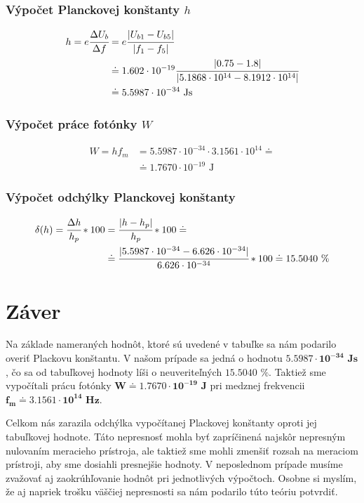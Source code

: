 \documentclass[12pt,a4paper,final]{report}
\begin{document}
\subsubsection{Výpočet Planckovej konštanty $h$}
\begin{align}
	h=e\cfrac{\Delta U_b}{\Delta f} &=e\cfrac{|U_{b1}-U_{b5}|}{|f_1-f_5|} \nonumber\\
	&\doteq 1.602\cdot 10^{-19} \cfrac{|0.75-1.8|}{|5.1868\cdot 10^{14}-8.1912\cdot 10^{14}|} \\
	&\doteq 5.5987\cdot10^{-34}\text{ Js}\nonumber
\end{align}

\subsubsection{Výpočet práce fotónky $W$}
\begin{align}
	W=hf_m &= 5.5987\cdot10^{-34} \cdot 3.1561\cdot10^{14}\doteq \\
	&\doteq 1.7670\cdot10^{-19}\text{ J}\nonumber
\end{align}

\subsubsection{Výpočet odchýlky Planckovej konštanty}
\begin{align}
	\delta(h)=\cfrac{\Delta h}{h_p}*100&=\cfrac{|h-h_p|}{h_p}*100\doteq\\
	&\doteq \cfrac{|5.5987\cdot10^{-34}-6.626\cdot10^{-34}|}{6.626\cdot10^{-34}}*100 \doteq 15.5040\text{ \%}\nonumber
\end{align}

\section*{Záver}
Na základe nameraných hodnôt, ktoré sú uvedené v tabuľke sa nám podarilo overiť Plackovu konštantu. V našom prípade sa jedná o hodnotu $\mathbf{5.5987\cdot10^{-34}\textbf{ Js}}$, čo sa od tabuľkovej hodnoty líši o neuveriteľných $\mathbf{15.5040\textbf{ \%}}$. Taktiež sme vypočítali prácu fotónky $\mathbf{W \doteq 1.7670\cdot10^{-19}\textbf{ J}}$ pri medznej frekvencii $\mathbf{f_m \doteq 3.1561\cdot10^{14}\textbf{ Hz}}$.

Celkom nás zarazila odchýlka vypočítanej Plackovej konštanty oproti jej tabuľkovej hodnote. Táto nepresnosť mohla byť zapríčinená najskôr nepresným nulovaním meracieho prístroja, ale taktiež sme mohli zmenšiť rozsah na meraciom prístroji, aby sme dosiahli presnejšie hodnoty. V neposlednom prípade musíme zvažovať aj zaokrúhľovanie hodnôt pri jednotlivých výpočtoch. Osobne si myslím, že aj napriek trošku väščiej nepresnosti sa nám podarilo túto teóriu potvrdiť.
\end{document}
